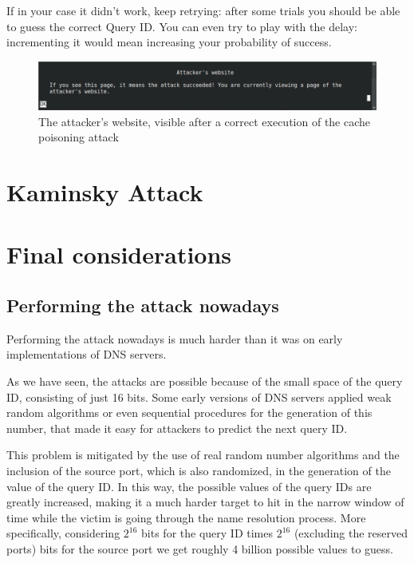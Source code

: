 \documentclass[11pt,a4paper]{article}
\begin{document}
\noindent
If in your case it didn't work, keep retrying: after some trials you should be able to guess the correct Query ID. You can even try to play with the delay: incrementing it would mean increasing your probability of success.

\begin{figure}[h!]
    \centering
    \includegraphics[width=\textwidth]{attacker-website.png}
    \caption{The attacker's website, visible after a correct execution of the cache poisoning attack}
    \label{fig:attacker-website}
\end{figure}

\newpage
\section{Kaminsky Attack}

\section{Final considerations}
\label{sec:final-considerations}

\subsection{Performing the attack nowadays}

Performing the attack nowadays is much harder than it was on early implementations of DNS servers. 

\noindent
As we have seen, the attacks are possible because of the small space of the query ID, consisting of just 16 bits. Some early versions of DNS servers applied weak random algorithms or even sequential procedures for the generation of this number, that made it easy for attackers to predict the next query ID.

\noindent
This problem is mitigated by the use of real random number algorithms and the inclusion of the source port, which is also randomized, in the generation of the value of the query ID. In this way, the possible values of the query IDs are greatly increased, making it a much harder target to hit in the narrow window of time while the victim is going through the name resolution process. More specifically, considering $2^{16}$ bits for the query ID times $2^{16}$ (excluding the reserved ports) bits for the source port we get roughly 4 billion possible values to guess.
\end{document}
